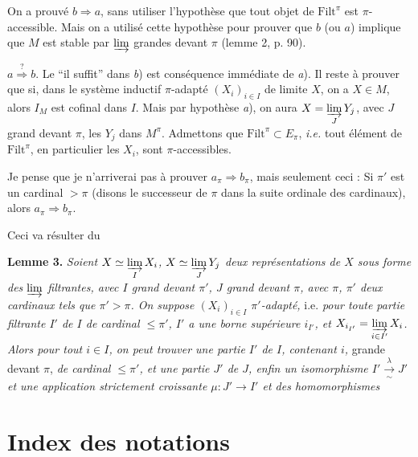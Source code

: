 \documentclass[11pt]{article}
\newcommand{\printedpage}[1]{\marginpar{\footnotesize p.~#1}}
\newcommand{\msp}[1]{\marginpar{\footnotesize [#1]}}
\begin{document}
On a prouvé $b\Longrightarrow a$, sans utiliser l'hypothèse que tout objet de $\mathrm{Filt}^\pi$ est $\pi$-accessible. Mais on a utilisé cette hypothèse pour prouver que $b$ (ou $a$) implique que $M$ est stable par $\varinjlim$ grandes devant $\pi$ (lemme 2, p. 90).

$a\overset{?}{\Longrightarrow} b$. Le ``il suffit'' dans \textit{b}) est conséquence immédiate de \textit{a}). Il reste à prouver que si, dans le système inductif $\pi$-adapté $(X_i)_{i\in I}$ de limite $X$, on a $X\in M$, alors $I_M$ est cofinal dans $I$. Mais par hypothèse \textit{a}), on aura $X = \varinjlim\limits_J Y_j$, avec $J$ grand devant $\pi$, les $Y_j$ dans $M^\pi$. Admettons que $\mathrm{Filt}^\pi\subset E_\pi$, \textit{i.e.} tout élément de $\mathrm{Filt}^\pi$, en particulier les $X_i$, sont $\pi$-accessibles.

Je pense que je n'arriverai pas à prouver $a_\pi\Longrightarrow b_\pi$, mais seulement ceci : Si $\pi'$ est un cardinal $>\pi$ (disons le successeur de $\pi$ dans la suite ordinale des cardinaux), alors $a_\pi\Longrightarrow b_\pi$.

\msp{page 98}Ceci va résulter du

\textbf{Lemme 3.} \textit{Soient $X\simeq\varinjlim\limits_I X_i$, $X\simeq\varinjlim\limits_J Y_j$ deux représentations de $X$ sous forme des $\varinjlim$ filtrantes, avec $I$ grand devant $\pi'$, $J$ grand devant $\pi$, avec $\pi$, $\pi'$ deux cardinaux tels que $\pi'>\pi$. On suppose $(X_i)_{i\in I}$ $\pi'$-adapté,} i.e. \textit{pour toute partie filtrante $I'$ de $I$ de cardinal $\le\pi'$, $I'$ a une borne supérieure $i_{I'}$, et $X_{i_{I'}} = \varinjlim\limits_{i\in I'} X_i$. Alors pour tout $i\in I$, on peut trouver une partie $I'$ de $I$, contenant $i$,} grande devant $\pi$, \textit{de cardinal $\le\pi'$, et une partie $J'$ de $J$, enfin un isomorphisme $I'\xrightarrow[\sim]{\lambda}J'$ et une application strictement croissante $\mu : J'\longrightarrow I'$ et des homomorphismes}

\newpage
\printedpage{53}

\section*{Index des notations}
\end{document}
